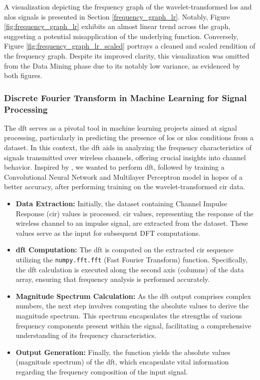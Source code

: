 A visualization depicting the frequency graph of the wavelet-transformed \acrshort{los} and \acrshort{nlos} signals is presented in Section \ref{frequency_graph_lr}. Notably, Figure \ref{fig:frequency_graph_lr} exhibits an almost linear trend across the graph, suggesting a potential misapplication of the underlying function. Conversely, Figure \ref{fig:frequency_graph_lr_scaled} portrays a cleaned and scaled rendition of the frequency graph. Despite its improved clarity, this visualization was omitted from the Data Mining phase due to its notably low variance, as evidenced by both figures.

\subsubsection{\Gls{Discrete Fourier Transform} in Machine Learning for Signal Processing}

The \acrshort{dft} serves as a pivotal tool in machine learning projects aimed at signal processing, particularly in predicting the presence of \acrshort{los} or \acrshort{nlos} conditions from a dataset. In this context, the \acrshort{dft} aids in analyzing the frequency characteristics of signals transmitted over wireless channels, offering crucial insights into channel behavior. Inspired by \cite{8682194}, we wanted to perform \acrshort{dft}, followed by training a \Gls{Convolutional Neural Network} and \Gls{Multilayer Perceptron} model in hopes of a better accuracy, after performing training on the wavelet-transformed \acrshort{cir} data.

\begin{itemize}
    \item \textbf{Data Extraction:} Initially, the dataset containing Channel Impulse Response (\acrshort{cir}) values is processed. \acrshort{cir} values, representing the response of the wireless channel to an impulse signal, are extracted from the dataset. These values serve as the input for subsequent DFT computations.
    
    \item \textbf{\acrshort{dft} Computation:} The \acrshort{dft} is computed on the extracted \acrshort{cir} sequence utilizing the \texttt{numpy.fft.fft} (Fast Fourier Transform) function. Specifically, the \acrshort{dft} calculation is executed along the second axis (columns) of the data array, ensuring that frequency analysis is performed accurately.
    
    \item \textbf{Magnitude Spectrum Calculation:} As the \acrshort{dft} output comprises complex numbers, the next step involves computing the absolute values to derive the magnitude spectrum. This spectrum encapsulates the strengths of various frequency components present within the signal, facilitating a comprehensive understanding of its frequency characteristics.
    
    \item \textbf{Output Generation:} Finally, the function yields the absolute values (magnitude spectrum) of the \acrshort{dft}, which encapsulate vital information regarding the frequency composition of the input signal.
\end{itemize}

